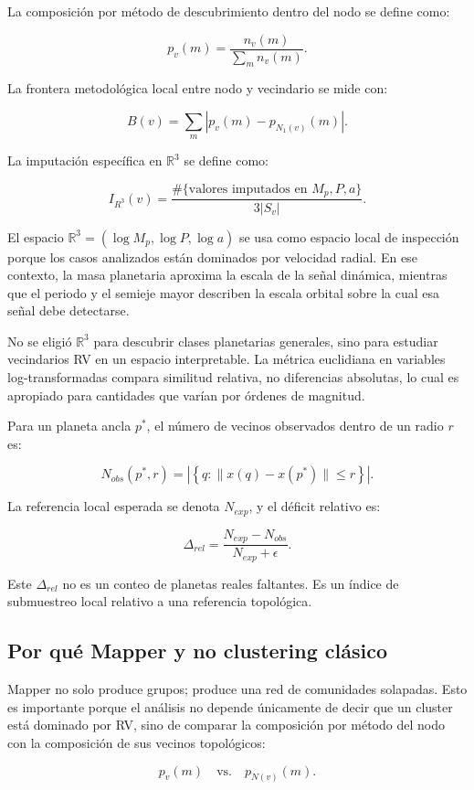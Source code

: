 \documentclass[11pt]{article}
\begin{document}
La composición por método de descubrimiento dentro del nodo se define como:

\[
p_v(m)=\frac{n_v(m)}{\sum_m n_v(m)}.
\]

La frontera metodológica local entre nodo y vecindario se mide con:

\[
B(v)=\sum_m |p_v(m)-p_{N_1(v)}(m)|.
\]

La imputación específica en $\mathbb{R}^3$ se define como:

\[
I_{R^3}(v)=
\frac{
\#\{\text{valores imputados en }M_p,P,a\}
}{3|S_v|}.
\]

El espacio $\mathbb{R}^3=(\log M_p,\log P,\log a)$ se usa como espacio local de inspección porque los casos analizados están dominados por velocidad radial. En ese contexto, la masa planetaria aproxima la escala de la señal dinámica, mientras que el periodo y el semieje mayor describen la escala orbital sobre la cual esa señal debe detectarse.

No se eligió $\mathbb{R}^3$ para descubrir clases planetarias generales, sino para estudiar vecindarios RV en un espacio interpretable. La métrica euclidiana en variables log-transformadas compara similitud relativa, no diferencias absolutas, lo cual es apropiado para cantidades que varían por órdenes de magnitud.

Para un planeta ancla $p^*$, el número de vecinos observados dentro de un radio $r$ es:

\[
N_{obs}(p^*,r)=
\left|\left\{q:\|x(q)-x(p^*)\|\leq r\right\}\right|.
\]

La referencia local esperada se denota $N_{exp}$, y el déficit relativo es:

\[
\Delta_{rel}=\frac{N_{exp}-N_{obs}}{N_{exp}+\epsilon}.
\]

Este $\Delta_{rel}$ no es un conteo de planetas reales faltantes. Es un índice de submuestreo local relativo a una referencia topológica.

\subsection{Por qué Mapper y no clustering clásico}

Mapper no solo produce grupos; produce una red de comunidades solapadas. Esto es importante porque el análisis no depende únicamente de decir que un cluster está dominado por RV, sino de comparar la composición por método del nodo con la composición de sus vecinos topológicos:

\[
p_v(m) \quad \text{vs.} \quad p_{N(v)}(m).
\]
\end{document}
